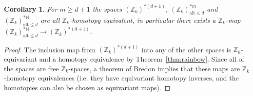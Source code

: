 \documentclass[11pt,a4paper,draft]{article}
\newcommand{\Z}{{\mathbb Z}}
\newcommand{\N}{{\mathbb N}}
\newcommand\alt{{\mathrm{alt}}}
\newtheorem{corollary}[theorem]{Corollary}
\theoremstyle{definition}
\begin{document}
\begin{corollary}\label{cor:rainbow} For $m \geq  d+1$
the spaces $(\Z_k)^{*(d+1)}$, $(\Z_k)^{*m}_{\alt\le d}$  and
$(\Z_k)^{*\N}_{\alt \le d}$ are all $\Z_k$-homotopy equivalent, in
particular there exists a $\Z_k$-map
$(\Z_k)^{*\N}_{\alt \le d}\to(\Z_k)^{*(d+1)}$.
\end{corollary}

\begin{proof}
The inclusion map from $(\Z_k)^{*(d+1)}$ into any of the
other  spaces is
$\Z_k$-equivariant and a homotopy equivalence by
Theorem~\ref{thm:rainbow}.  Since all of the spaces are free
$\Z_k$-spaces, a theorem of Bredon \cite[Ch.~II]{bredon-cohom}
\cite[Sec.~II.2]{dieck} implies that
these maps are $\Z_k$-homotopy equivalences (i.e. they have equivariant homotopy
inverses, and the homotopies can also be chosen as equivariant maps).
\end{proof}
\end{document}
